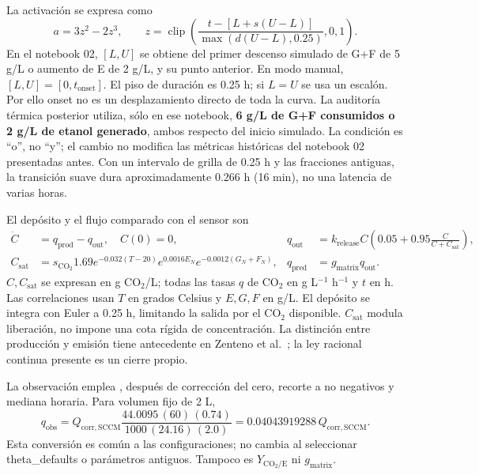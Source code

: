 \documentclass[10pt,a4paper]{article}
\newcommand{\qp}{q_{\mathrm{prod}}}
\newcommand{\qo}{q_{\mathrm{out}}}
\newcommand{\qhat}{q_{\mathrm{pred}}}
\newcommand{\clip}{\operatorname{clip}}
\newcommand{\code}[1]{\path{#1}}
\begin{document}
La activación se expresa como
\begin{equation}
a=3z^2-2z^3,\qquad
z=\clip\left(\frac{t-[L+s(U-L)]}{\max(d(U-L),0.25)},0,1\right).
\label{eq:gate}
\end{equation}
En el notebook 02, $[L,U]$ se obtiene del primer descenso simulado de G+F de
5 g/L o aumento de E de 2 g/L, y su punto anterior. En modo manual,
$[L,U]=[0,t_{\mathrm{onset}}]$. El piso de duración es 0.25 h; si $L=U$ se
usa un escalón. Por ello onset no es un desplazamiento directo de toda la curva.
La auditoría térmica posterior utiliza, sólo en ese notebook,
\textbf{6 g/L de G+F consumidos o 2 g/L de etanol generado}, ambos respecto
del inicio simulado. La condición es ``o'', no ``y''; el cambio no modifica
las métricas históricas del notebook 02 presentadas antes.
Con un intervalo de grilla de 0.25 h y las fracciones antiguas, la transición
suave dura aproximadamente 0.266 h (16 min), no una latencia de varias horas.

El depósito y el flujo comparado con el sensor son
\begin{align}
\dot C&=\qp-\qo,\quad C(0)=0,&
\qo&=k_{\mathrm{release}}C\left(0.05+0.95\frac{C}{C+C_{\mathrm{sat}}}\right),\label{eq:pool}\\
C_{\mathrm{sat}}&=s_{\mathrm{CO_2}}1.69e^{-0.032(T-20)}e^{0.0016E_N}
e^{-0.0012(G_N+F_N)},&
\qhat&=g_{\mathrm{matrix}}\qo.\label{eq:sensor}
\end{align}
$C,C_{\mathrm{sat}}$ se expresan en g CO\(_2\)/L; todas las tasas $q$ de
CO\(_2\) en g L$^{-1}$ h$^{-1}$ y $t$ en h. Las correlaciones usan $T$ en
grados Celsius y $E,G,F$ en g/L. El depósito se integra con Euler a 0.25 h,
limitando la salida por el CO\(_2\) disponible. $C_{\mathrm{sat}}$ modula
liberación, no impone una cota rígida de concentración. La distinción entre
producción y emisión tiene antecedente en Zenteno et al.~\cite{zenteno};
la ley racional continua presente es un cierre propio.

La observación emplea \code{SCCM_CORRECTED}, después de corrección del cero,
recorte a no negativos y mediana horaria. Para volumen fijo de 2 L,
\begin{equation}
q_{\mathrm{obs}}=Q_{\mathrm{corr,SCCM}}
\frac{44.0095\,(60)\,(0.74)}{1000\,(24.16)\,(2.0)}
=0.04043919288\,Q_{\mathrm{corr,SCCM}}.
\label{eq:sccm}
\end{equation}
Esta conversión es común a las configuraciones; no cambia al seleccionar
theta\_defaults o parámetros antiguos. Tampoco es $Y_{\mathrm{CO_2/E}}$
ni $g_{\mathrm{matrix}}$.
\end{document}

